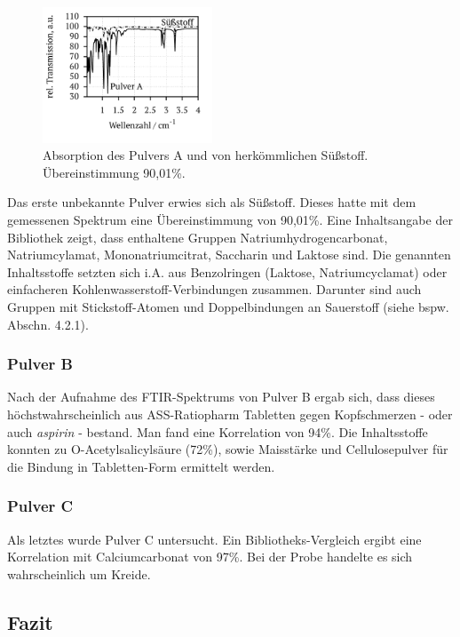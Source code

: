 \documentclass[a4paper,10pt,twocolumn]{article}
\newcommand{\tilt}[1]{\textit{#1}}
\begin{document}
				\begin{figure}[H]
					\centering
					\includegraphics[width=0.45\textwidth]{Gruppe2A/pulver_a.pdf}
					\caption{Absorption des Pulvers A und von herk\"ommlichen S\"u{\ss}stoff. \"Ubereinstimmung 90,01\%.}
					\label{img:a}
				\end{figure}

		Das erste unbekannte Pulver erwies sich als S\"u{\ss}stoff. Dieses hatte mit dem gemessenen Spektrum eine \"Ubereinstimmung von 90,01\%. Eine Inhaltsangabe der Bibliothek zeigt, dass enthaltene Gruppen Natriumhydrogencarbonat, Natriumcylamat, Mononatriumcitrat, Saccharin und Laktose sind. Die genannten Inhaltsstoffe setzten sich i.A. aus Benzolringen (Laktose, Natriumcyclamat) oder einfacheren Kohlenwasserstoff-Verbindungen zusammen. Darunter sind auch Gruppen mit Stickstoff-Atomen und Doppelbindungen an Sauerstoff (siehe bspw. Abschn. 4.2.1).

		\subsubsection{Pulver B}

		Nach der  Aufnahme des FTIR-Spektrums von Pulver B ergab sich, dass dieses h\"ochstwahrscheinlich aus ASS-Ratiopharm Tabletten gegen Kopfschmerzen - oder auch \tilt{aspirin} - bestand. Man fand eine Korrelation von 94\%. Die Inhaltsstoffe konnten zu O-Acetylsalicyls\"aure (72\%), sowie Maisst\"arke und Cellulosepulver f\"ur die Bindung in Tabletten-Form ermittelt werden.

		\subsubsection{Pulver C}

		Als letztes wurde Pulver C untersucht. Ein Bibliotheks-Vergleich ergibt eine Korrelation mit Calciumcarbonat von 97\%. Bei der Probe handelte es sich wahrscheinlich um Kreide.

	\clearpage

		\subsection{Fazit}
\end{document}
